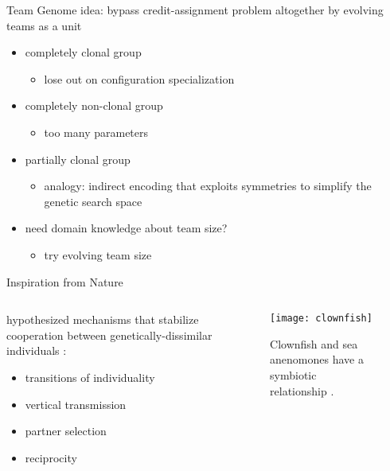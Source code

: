\begin{frame}{Team Genome}
idea: bypass credit-assignment problem altogether by evolving teams as a unit

\begin{itemize}
\item completely clonal group
\begin{itemize}
\item lose out on configuration specialization
\end{itemize}
\item completely non-clonal group
\begin{itemize}
\item too many parameters
\end{itemize}
\item partially clonal group \cite{bongard2000legion}
\begin{itemize}
\item analogy: indirect encoding that exploits symmetries to simplify the genetic search space \cite{clune2011performance}
\end{itemize}
\item need domain knowledge about team size?
\begin{itemize}
\item try evolving team size \cite{bongard2000legion}
\end{itemize}

\end{itemize}

\end{frame}

\begin{frame}{Inspiration from Nature}

\begin{columns}
\begin{column}{0.5\textwidth}
hypothesized mechanisms that stabilize cooperation between genetically-dissimilar individuals \cite{vostinar2017suicide, andre2016evolutionary}:
\begin{itemize}
\item transitions of individuality
\item vertical transmission
\item partner selection
\item reciprocity
\end{itemize}
\end{column}
\begin{column}{0.5\textwidth}
\begin{figure}
\texttt{[image: clownfish]}
\caption{
Clownfish and sea anenomones have a symbiotic relationship \cite{dunn1981clownfish}.
}
\label{fig:clownfish}
\end{figure}
\end{column}
\end{columns}
\end{frame}
